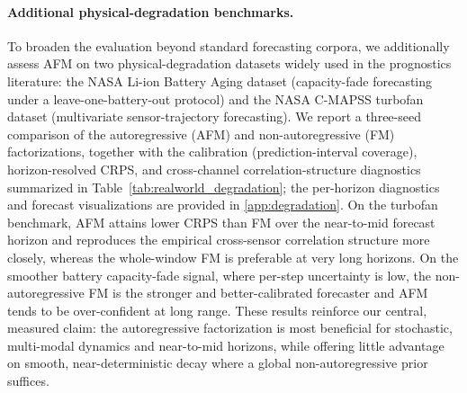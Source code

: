 \documentclass[preprint,12pt,authoryear]{elsarticle}
\newcommand{\oldrev}[1]{#1}
\begin{document}
{\paragraph{Additional physical-degradation benchmarks.} To broaden the evaluation beyond standard forecasting corpora, we additionally assess AFM on two physical-degradation datasets widely used in the prognostics literature: the NASA Li-ion Battery Aging dataset (capacity-fade forecasting under a leave-one-battery-out protocol) and the NASA C-MAPSS turbofan dataset (multivariate sensor-trajectory forecasting). We report a three-seed comparison of the autoregressive (AFM) and non-autoregressive (FM) factorizations, together with the calibration (prediction-interval coverage), horizon-resolved CRPS, and cross-channel correlation-structure diagnostics summarized in Table~\ref{tab:realworld_degradation}; the per-horizon diagnostics and forecast visualizations are provided in \ref{app:degradation}. On the turbofan benchmark, AFM attains lower CRPS than FM over the near-to-mid forecast horizon and reproduces the empirical cross-sensor correlation structure more closely, whereas the whole-window FM is preferable at very long horizons. On the smoother battery capacity-fade signal, where per-step uncertainty is low, the non-autoregressive FM is the stronger and better-calibrated forecaster and AFM tends to be over-confident at long range. These results reinforce our central, measured claim: the autoregressive factorization is most beneficial for stochastic, multi-modal dynamics and near-to-mid horizons, while offering little advantage on smooth, near-deterministic decay where a global non-autoregressive prior suffices.}
\begin{table}[t]\centering
\resizebox{\textwidth}{!}{}
\caption{\oldrev{AFM-vs-FM comparison on the two real-world degradation benchmarks (mean$\pm$std). ``CRPS-Sum'' is the CRPS of the channel-summed forecast, an aggregate multivariate score; ``corr-dist'' is the Frobenius distance between the forecast and ground-truth cross-channel correlation matrices (lower is better for both). Per-horizon calibration/CRPS diagnostics, the cross-sensor correlation maps, and example probabilistic forecasts are provided in \ref{app:degradation}.}}
\label{tab:realworld_degradation}
\end{table}
\end{document}
